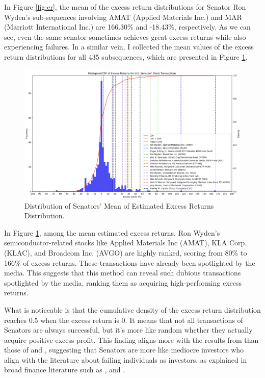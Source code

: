 \documentclass[15pt,letterpaper]{article}
\begin{document}
  In Figure \ref{fig:er}, the mean of the excess return distributions for Senator Ron Wyden's sub-sequences involving AMAT (Applied Materials Inc.) and MAR (Marriott International Inc.) are 166.30\% and -18.43\%, respectively. 
  As we can see, even the same senator sometimes achieves great excess returns while also experiencing failures. 
  In a similar vein, I collected the mean values of the excess return distributions for all 435 subsequences, which are presented in Figure \ref{fig:erfin}.

\begin{figure}[h!]
  \centering
  \includegraphics[width=1\textwidth, height=0.5\textheight]{imgs/ERFin3.png}
  \caption{Distribution of Senators' Mean of Estimated Excess Returns Distribution.}
  \label{fig:erfin}
\end{figure}

In Figure \ref{fig:erfin}, among the mean estimated excess returns, Ron Wyden's semiconductor-related stocks like Applied Materials Inc (AMAT), KLA Corp. (KLAC), and Broadcom Inc. (AVGO) are highly ranked, scoring from 80\% to 166\% of excess returns. These transactions have already been spotlighted by the media. This suggests that this method can reveal such dubious transactions spotlighted by the media, ranking them as acquiring high-performing excess returns.

What is noticeable is that the cumulative density of the excess return distribution reaches 0.5 when the excess return is 0. It means that not all transactions of Senators are always successful, but it's more like random whether they actually acquire positive excess profit. This finding aligns more with the results from \cite{eg13} than those of \cite{zi24} and \cite{zi11}, suggesting that Senators are more like mediocre investors who align with the literature about failing individuals as investors, as explained 
in broad finance literature such as \cite{barberis2003}, and \cite{barber2000}.
\end{document}
